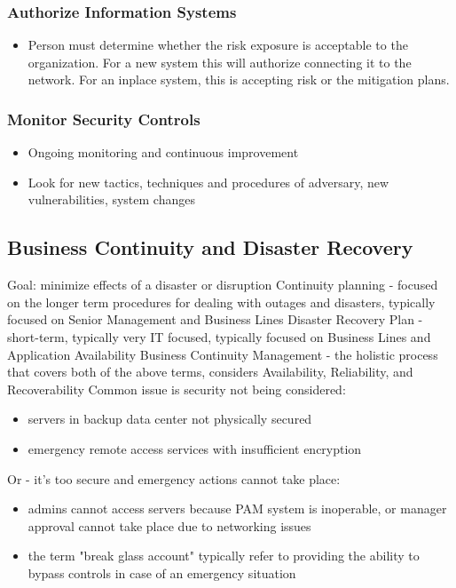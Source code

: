 \documentclass[11pt]{article}
\begin{document}
\subsubsection{Authorize Information Systems}
\label{sec:orgaff7e0c}
\begin{itemize}
\item Person must determine whether the risk exposure is acceptable to the organization. For a new system this will authorize connecting it to the network. For an inplace system, this is accepting risk or the mitigation plans.
\end{itemize}
\subsubsection{Monitor Security Controls}
\label{sec:org0a67a9b}
\begin{itemize}
\item Ongoing monitoring and continuous improvement
\item Look for new tactics, techniques and procedures of adversary, new vulnerabilities, system changes
\end{itemize}
\subsection{Business Continuity and Disaster Recovery}
\label{sec:org560a3e1}
Goal: minimize effects of a disaster or disruption
Continuity planning - focused on the longer term procedures for dealing with outages and disasters, typically focused on Senior Management and Business Lines
Disaster Recovery Plan - short-term, typically very IT focused, typically focused on Business Lines and Application Availability
Business Continuity Management - the holistic process that covers both of the above terms, considers Availability, Reliability, and Recoverability
Common issue is security not being considered:
\begin{itemize}
\item servers in backup data center not physically secured
\item emergency remote access services with insufficient encryption
\end{itemize}
Or - it's too secure and emergency actions cannot take place:
\begin{itemize}
\item admins cannot access servers because PAM system is inoperable, or manager approval cannot take place due to networking issues
\item the term "break glass account" typically refer to providing the ability to bypass controls in case of an emergency situation
\end{itemize}
\end{document}
